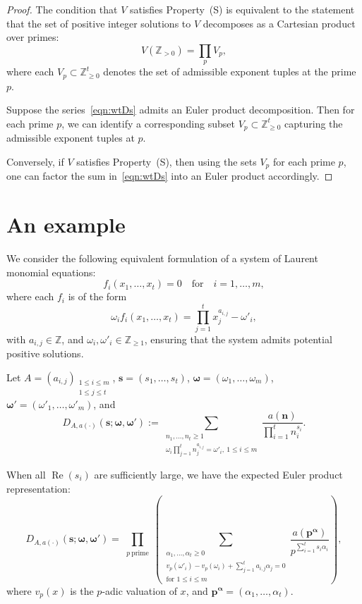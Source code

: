 \documentclass[12pt,reqno]{amsart}
\numberwithin{equation}{section}
\theoremstyle{plain}
\theoremstyle{definition}
\theoremstyle{remark}
\renewcommand{\Re}{\operatorname{Re}}
\begin{document}
\begin{proof}
The condition that $V$ satisfies Property~(S) is equivalent to the statement that the set of positive integer solutions to $V$ decomposes as a Cartesian product over primes:
\[
V(\mathbb{Z}_{>0}) = \prod_p V_p,
\]
where each \( V_p \subset \mathbb{Z}_{\geq 0}^t \) denotes the set of admissible exponent tuples at the prime $p$.

Suppose the series~\eqref{eqn:wtDs} admits an Euler product decomposition. Then for each prime $p$, we can identify a corresponding subset \( V_p \subset \mathbb{Z}_{\geq 0}^t \) capturing the admissible exponent tuples at $p$.

Conversely, if $V$ satisfies Property~(S), then using the sets \( V_p \) for each prime $p$, one can factor the sum in~\eqref{eqn:wtDs} into an Euler product accordingly.
\end{proof}

\section{An example}

We consider the following equivalent formulation of a system of Laurent monomial equations:
\[
f_i(x_1,\ldots,x_t) = 0 \quad \text{for} \quad i = 1,\ldots,m,
\]
where each \( f_i \) is of the form
\[
\omega_i f_i(x_1,\ldots,x_t) = \prod_{j=1}^{t} x_j^{a_{i,j}} - \omega'_i,
\]
with \( a_{i,j} \in \mathbb{Z} \), and \( \omega_i,\omega'_i \in \mathbb{Z}_{\geq 1} \), ensuring that the system admits potential positive solutions.

Let $A=(a_{i,j})_{\substack{1\leq i\leq m\\1\leq j\leq t}}$, $\boldsymbol{s}=(s_1,\dots,s_t)$,
 $\boldsymbol{\omega}=(\omega_1,\dots,\omega_m)$,
 $\boldsymbol{\omega'}=(\omega'_1,\dots,\omega'_m)$, and
\[
D_{A,a(\boldsymbol{\cdot})}
(\boldsymbol{s};\boldsymbol{\omega},\boldsymbol{\omega'})
:=
\sum_{\substack{n_1,\dots,n_t \geq 1 \\ \omega_i\prod_{j=1}^{t}n_j^{a_{i,j}}=\omega'_i,~1\leq i\leq m}}
\frac{a(\boldsymbol{n})}{\prod_{i=1}^{t} n_i^{s_i}}.
\]

When all $\Re(s_i)$ are sufficiently large, we have the expected Euler product representation:
\[
D_{A,a(\boldsymbol{\cdot})}
(\boldsymbol{s};\boldsymbol{\omega},\boldsymbol{\omega'}) =
\prod_{\substack{p~\text{prime}}}
\left(
\sum_{\substack{\alpha_1,\dots,\alpha_t \geq 0 \\
v_p(\omega'_i)-v_p(\omega_i)
+\sum_{j=1}^{t}a_{i,j}\alpha_j
=0 \\
\text{for } 1 \leq i \leq m}}
\frac{a(\boldsymbol{p^\alpha})}
{p^{\sum_{i=1}^{t}s_i\alpha_i}}
\right),
\]
where $v_p(x)$ is the $p$-adic valuation of $x$, and $\boldsymbol{p^\alpha}=(\alpha_1,\dots,\alpha_t)$.
\end{document}
